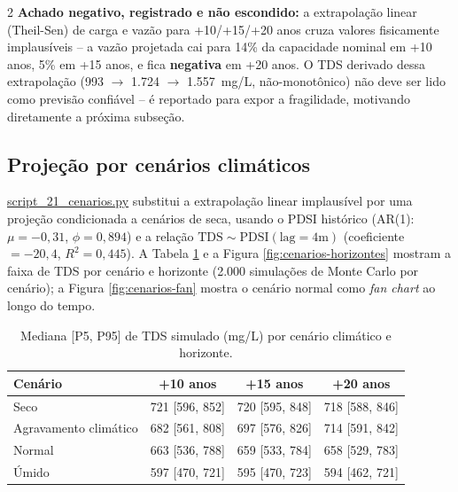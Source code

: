 \begin{multicols*}{2}
\textbf{Achado negativo, registrado e não escondido:} a extrapolação linear (Theil-Sen) de carga e vazão para +10/+15/+20 anos cruza valores fisicamente implausíveis -- a vazão projetada cai para 14\% da capacidade nominal em +10 anos, 5\% em +15 anos, e fica \textbf{negativa} em +20 anos. O TDS derivado dessa extrapolação (993 $\to$ 1.724 $\to$ 1.557~mg/L, não-monotônico) não deve ser lido como previsão confiável -- é reportado para expor a fragilidade, motivando diretamente a próxima subseção.

\subsection{Projeção por cenários climáticos}

\url{script_21_cenarios.py} substitui a extrapolação linear implausível por uma projeção condicionada a cenários de seca, usando o PDSI histórico (AR(1): $\mu=-0{,}31$, $\phi=0{,}894$) e a relação $\mathrm{TDS} \sim \mathrm{PDSI}(\text{lag}=4\text{m})$ (coeficiente $=-20{,}4$, $R^2=0{,}445$). A Tabela \ref{tab:cenarios} e a Figura \ref{fig:cenarios-horizontes} mostram a faixa de TDS por cenário e horizonte (2.000 simulações de Monte Carlo por cenário); a Figura \ref{fig:cenarios-fan} mostra o cenário normal como \textit{fan chart} ao longo do tempo.

\end{multicols*}
\begin{table}[H]
    \centering
    \begin{tabular}{l|c|c|c}
         Cenário & +10 anos & +15 anos & +20 anos \\ \hline
        Seco & 721 [596, 852] & 720 [595, 848] & 718 [588, 846] \\
        Agravamento climático & 682 [561, 808] & 697 [576, 826] & 714 [591, 842] \\
        Normal & 663 [536, 788] & 659 [533, 784] & 658 [529, 783] \\
        Úmido & 597 [470, 721] & 595 [470, 723] & 594 [462, 721] \\
    \end{tabular}
    \caption{Mediana [P5, P95] de TDS simulado (mg/L) por cenário climático e horizonte.}
    \label{tab:cenarios}
\end{table}
